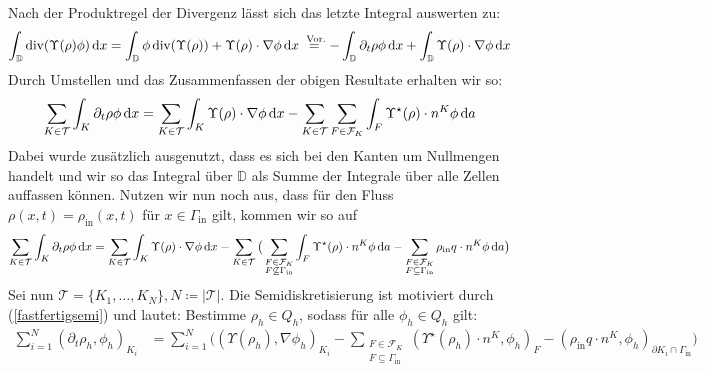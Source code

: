 Nach der Produktregel der Divergenz lässt sich das letzte Integral auswerten zu:
\begin{align*}
	 \int_{\mathbb{D}} \operatorname{div} (\Upsilon(\rho)\phi) \, \mathrm{d} x = \int_{\mathbb{D}} \phi \operatorname{div}(\Upsilon(\rho)) + \Upsilon(\rho) \cdot \nabla \phi \, \mathrm{d} x \stackrel{\text{ Vor.}}{=} - \int_{\mathbb{D}} \partial_t \rho \phi \, \mathrm{d} x + \int_{\mathbb{D}} \Upsilon(\rho) \cdot \nabla \phi \, \mathrm{d} x
\end{align*}
Durch Umstellen und das Zusammenfassen der obigen Resultate erhalten wir so: 
\begin{align*}
	\sum_{K \in \mathcal{T}} \int_K \partial_t \rho  \phi \, \mathrm{d} x = \sum_{K \in \mathcal{T}} \int_K \Upsilon(\rho ) \cdot \nabla \phi \, \mathrm{d} x - 	\sum_{K\in \mathcal{T}} \sum_{F \in \mathcal{F}_K} \int_F \Upsilon^{\star}(\rho) \cdot n^K \phi \, \mathrm{d} a
\end{align*}
Dabei wurde zusätzlich ausgenutzt, dass es sich bei den Kanten um Nullmengen handelt und wir so das Integral über $ \mathbb{D} $ als Summe der Integrale über alle Zellen auffassen können. Nutzen wir nun noch aus, dass für den Fluss  $\rho(x,t) = \rho_{\text{in}}(x,t)$ für $ x \in \Gamma_{\text{in}} $ gilt, kommen wir so auf 
\begin{align}
	\label{fastfertigsemi}
	\sum_{K \in \mathcal{T}} \int_K \partial_t \rho  \phi \, \mathrm{d} x = \sum_{K \in \mathcal{T}} \int_K \Upsilon(\rho ) \cdot \nabla \phi \, \mathrm{d} x - 	\sum_{K\in \mathcal{T}} \big( \sum_{\substack{F \in \mathcal{F}_K \\ F \not\subseteq \Gamma_{\text{in}}}} \int_F \Upsilon^{\star}(\rho) \cdot n^K \phi \, \mathrm{d} a - \sum_{\substack{F \in \mathcal{F}_K \\ F \subseteq \Gamma_{\text{in}}}} \rho_{\text{in}} q \cdot n^K \phi \, \mathrm{d} a \big)
\end{align}
Sei nun $ \mathcal{T} = \{ K_1,\dots , K_N\} , N \coloneqq |\mathcal{T}| $. Die Semidiskretisierung ist motiviert durch (\ref{fastfertigsemi}) und lautet: Bestimme  $\rho_h \in Q_h$, sodass für alle $ \phi_h \in Q_h $ gilt:
\begin{align}
	\label{Semidiskretisierung}
	\sum_{i=1}^N (\partial_t \rho_h, \phi_h)_{K_i} &= \sum_{i=1}^{N} \big( (\Upsilon(\rho_h), \nabla \phi_h)_{K_i} - \sum_{\substack{F \in \mathcal{F}_K \\ F \subseteq \Gamma_{\text{in}}}}(\Upsilon^{\star}(\rho_h)\cdot n^K,\phi_h)_{F} - (\rho_{\text{in}}q \cdot n^K,\phi_h)_{\partial K_i \cap \Gamma_{\text{in}}} \big)
\end{align}


